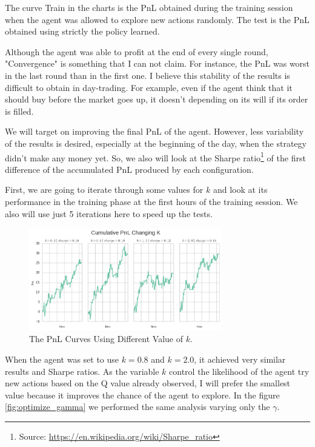 \documentclass[a4paper]{article}
\begin{document}
The curve Train in the charts is the PnL obtained during the training session when the agent was allowed to explore new actions randomly. The test is the PnL obtained using strictly the policy learned.

Although the agent was able to profit at the end of every single round,  "Convergence" is something that I can not claim. For instance, the PnL was worst in the last round than in the first one. I believe this stability of the results is difficult to obtain in day-trading. For example, even if the agent think that it should buy before the market goes up, it doesn't depending on its will if its order is filled.

We will target on improving the final PnL of the agent. However, less variability of the results is desired, especially at the beginning of the day, when the strategy didn't make any money yet. So, we also will look at the Sharpe ratio\footnote{Source: \url{https://en.wikipedia.org/wiki/Sharpe_ratio}} of the first difference of the accumulated PnL produced by each configuration.

First, we are going to iterate through some values for $k$ and look at its performance in the training phase at the first hours of the training session. We also will use just 5 iterations here to speed up the tests.

\begin{figure}[ht]
\centering
\includegraphics[width=0.75\textwidth]{figures/optimize_k.png}
\caption{\label{fig:optimize_k}The PnL Curves Using Different Value of $k$.}
\end{figure}

When the agent was set to use $k=0.8$ and $k=2.0$, it achieved very similar results and Sharpe ratios. As the variable $k$ control the likelihood of the agent try new actions based on the Q value already observed, I will prefer the smallest value because it improves the chance of the agent to explore. In the figure \ref{fig:optimize_gamma} we  performed the same analysis varying only the $\gamma$.
\end{document}
